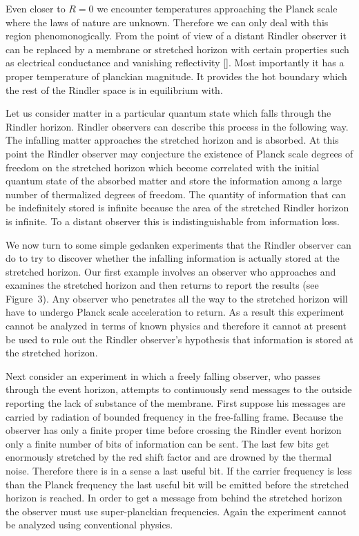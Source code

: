 Even closer to $R=0$ we encounter temperatures approaching the Planck
scale where the laws of nature are unknown.  Therefore we can only
deal with this region phenomonogically.  From the point of view of a
distant Rindler observer it can be replaced by a membrane or
stretched horizon with certain properties such as electrical
conductance and vanishing reflectivity [\mempar].  Most importantly
it has a proper temperature of planckian magnitude.  It provides the
hot boundary which the rest of the Rindler space is in equilibrium
with.

Let us consider matter in a particular quantum state which falls
through the Rindler horizon.  Rindler observers can describe this
process in the following way.  The infalling matter approaches the
stretched horizon and is absorbed.  At this point the Rindler
observer may conjecture the existence of Planck scale degrees of
freedom on the stretched horizon which become correlated with the
initial quantum state of the absorbed matter and store the
information among a large number of thermalized degrees of freedom.
The quantity of information that can be indefinitely stored is
infinite because the area of the stretched Rindler horizon is
infinite.  To a distant observer this is indistinguishable from
information loss.

We now turn to some simple gedanken experiments that the Rindler
observer can do to try to discover whether the infalling information
is actually stored at the stretched horizon.  Our first example
involves an observer who approaches and examines the stretched
horizon and then returns to report the results (see Figure~3).  Any
observer who penetrates all the way to the stretched horizon will
have to undergo Planck scale acceleration to return.  As a result
this experiment cannot be analyzed in terms of known physics and
therefore it cannot at present be used to rule out the Rindler
observer's hypothesis that information is stored at the stretched
horizon.

Next consider an experiment in which a freely falling observer, who
passes through the event horizon, attempts to continuously send
messages to the outside reporting the lack of substance of the
membrane.  First suppose his messages are carried by radiation of
bounded frequency in the free-falling frame.  Because the observer
has only a finite proper time before crossing the Rindler event
horizon only a finite number of bits of information can be sent.  The
last few bits get enormously stretched by the red shift factor and
are drowned by the thermal noise.  Therefore there is in a sense a
last useful bit.  If the carrier frequency is less than the Planck
frequency the last useful bit will be emitted before the stretched
horizon is reached.  In order to get a message from behind the
stretched horizon the observer must use super-planckian frequencies.
Again the experiment cannot be analyzed using conventional physics.

